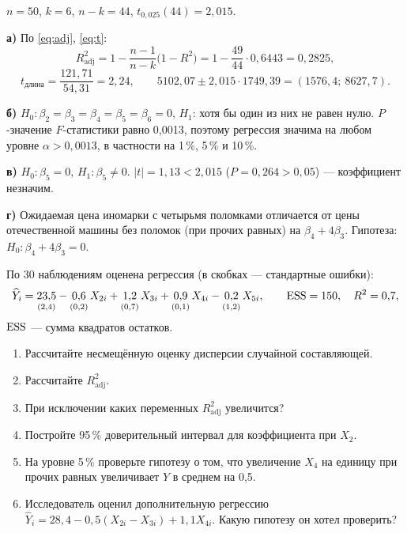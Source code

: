 \begin{solution}
$n = 50$, $k = 6$, $n - k = 44$, $t_{0{,}025}(44) = 2{,}015$.

\medskip
\textbf{а)} По \eqref{eq:adj}, \eqref{eq:t}:
\[
  R^2_{\text{adj}} = 1 - \frac{n-1}{n-k}\bigl(1 - R^2\bigr) = 1 - \frac{49}{44}\cdot 0{,}6443 = 0{,}2825,
\]
\[
  t_{\text{длина}} = \frac{121{,}71}{54{,}31} = 2{,}24,
  \qquad
  5102{,}07 \pm 2{,}015\cdot 1749{,}39 = (1576{,}4;\ 8627{,}7).
\]

\medskip
\textbf{б)} $H_0\colon \beta_2 = \beta_3 = \beta_4 = \beta_5 = \beta_6 = 0$,
$H_1$: хотя бы один из них не равен нулю. $P$-значение $F$-статистики равно
0,0013, поэтому регрессия значима на любом уровне $\alpha > 0{,}0013$, в
частности на 1\,\%, 5\,\% и 10\,\%.

\medskip
\textbf{в)} $H_0\colon \beta_5 = 0$, $H_1\colon \beta_5 \ne 0$.
$|t| = 1{,}13 < 2{,}015$ ($P = 0{,}264 > 0{,}05$) — коэффициент незначим.

\medskip
\textbf{г)} Ожидаемая цена иномарки с четырьмя поломками отличается от цены
отечественной машины без поломок (при прочих равных) на
$\beta_4 + 4\beta_3$. Гипотеза: $H_0\colon \beta_4 + 4\beta_3 = 0$.
\end{solution}


По 30 наблюдениям оценена регрессия (в скобках — стандартные ошибки):
\[
  \widehat{Y}_i = \underset{(2{,}4)}{23{,}5} - \underset{(0{,}2)}{0{,}6}\,X_{2i}
  + \underset{(0{,}7)}{1{,}2}\,X_{3i} + \underset{(0{,}1)}{0{,}9}\,X_{4i}
  - \underset{(1{,}2)}{0{,}2}\,X_{5i},
  \qquad \mathrm{ESS} = 150,\quad R^2 = 0{,}7,
\]
$\mathrm{ESS}$ — сумма квадратов остатков.
\begin{enumerate}[label=\asbuk*), leftmargin=2.2em, itemsep=3pt]
  \item Рассчитайте несмещённую оценку дисперсии случайной составляющей.
  \item Рассчитайте $R^2_{\text{adj}}$.
  \item При исключении каких переменных $R^2_{\text{adj}}$ увеличится?
  \item Постройте 95\,\% доверительный интервал для коэффициента при $X_2$.
  \item На уровне 5\,\% проверьте гипотезу о том, что увеличение $X_4$ на
        единицу при прочих равных увеличивает $Y$ в среднем на 0,5.
  \item Исследователь оценил дополнительную регрессию
        $\widehat{Y}_i = 28{,}4 - 0{,}5(X_{2i} - X_{3i}) + 1{,}1X_{4i}$.
        Какую гипотезу он хотел проверить?
\end{enumerate}

